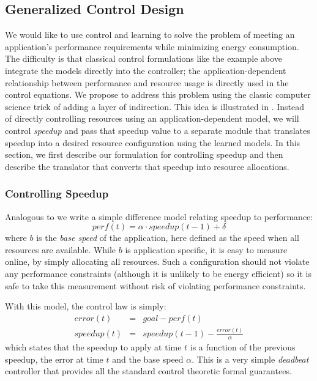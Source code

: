 \subsection{Generalized Control Design}
We would like to use control and learning to solve the problem of
meeting an application's performance requirements while minimizing
energy consumption.  The difficulty is that classical control
formulations like the example above integrate the models directly into
the controller; \ie the application-dependent relationship between
performance and resource usage is directly used in the control
equations.  We propose to address this problem using the classic
computer science trick of adding a layer of indirection.  This idea is
illustrated in .  Instead of directly controlling
resources using an application-dependent model, we will control
\emph{speedup} and pass that speedup value to a separate module that
translates speedup into a desired resource configuration using the
learned models.  In this section, we first describe our formulation
for controlling speedup and then describe the translator that converts
that speedup into resource allocations.

\subsubsection{Controlling Speedup}
Analogous to  we write a simple difference model
relating speedup to performance:
\begin{equation}
  perf(t) = \alpha \cdot speedup(t-1) + \delta \label{eqn:speedup}
\end{equation}
where $b$ is the \emph{base speed} of the application, here defined as
the speed when all resources are available.  While $b$ is application
specific, it is easy to measure online, by simply allocating all
resources. Such a configuration should not violate any performance
constraints (although it is unlikely to be energy efficient) so it is
safe to take this measurement without risk of violating performance
constraints.

With this model, the control law is simply:
\begin{eqnarray}
  error(t) &=& goal - perf(t) \label{eqn:speedup-error} \\
  speedup(t) &=& speedup(t-1) - \frac{error(t)}{\alpha}
  \label{eqn:speedup-control}
\end{eqnarray}
which states that the speedup to apply at time $t$ is a function of
the previous speedup, the error at time $t$ and the base speed $\alpha$.
This is a very simple \emph{deadbeat}  controller that provides
all the standard control theoretic formal guarantees.

